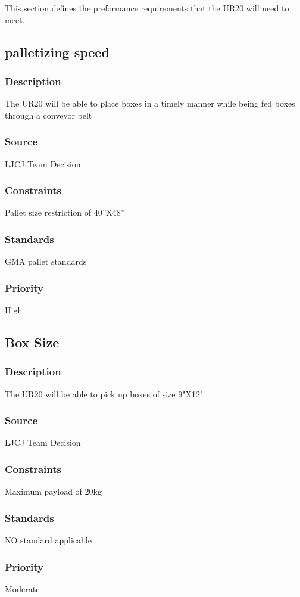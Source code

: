 This section defines the preformance requirements that the UR20 will need to meet. 

\subsection{palletizing speed}
\subsubsection{Description}
The UR20 will be able to place boxes in a timely manner while being fed boxes through a conveyor belt 
\subsubsection{Source}
LJCJ Team Decision
\subsubsection{Constraints}
Pallet size restriction of 40''X48''
\subsubsection{Standards}
GMA pallet standards
\subsubsection{Priority}
High

\subsection{Box Size}
\subsubsection{Description}
The UR20 will be able to pick up boxes of size 9"X12" 
\subsubsection{Source}
LJCJ Team Decision
\subsubsection{Constraints}
Maximum payload of 20kg 
\subsubsection{Standards}
NO standard applicable
\subsubsection{Priority}
Moderate


